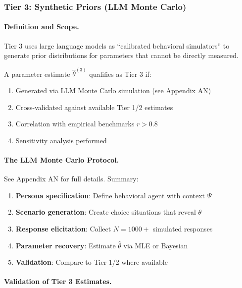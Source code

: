 \subsubsection{Tier 3: Synthetic Priors (LLM Monte Carlo)}

\paragraph{Definition and Scope.}

Tier 3 uses large language models as ``calibrated behavioral simulators'' to 
generate prior distributions for parameters that cannot be directly measured.

\begin{definition}
A parameter estimate $\hat{\theta}^{(3)}$ qualifies as Tier 3 if:
\begin{enumerate}
    \item Generated via LLM Monte Carlo simulation (see Appendix AN)
    \item Cross-validated against available Tier 1/2 estimates
    \item Correlation with empirical benchmarks $r > 0.8$
    \item Sensitivity analysis performed
\end{enumerate}
\end{definition}

\paragraph{The LLM Monte Carlo Protocol.}

See Appendix AN for full details. Summary:

\begin{enumerate}
    \item \textbf{Persona specification}: Define behavioral agent with context $\Psi$
    \item \textbf{Scenario generation}: Create choice situations that reveal $\theta$
    \item \textbf{Response elicitation}: Collect $N = 1000+$ simulated responses
    \item \textbf{Parameter recovery}: Estimate $\hat{\theta}$ via MLE or Bayesian
    \item \textbf{Validation}: Compare to Tier 1/2 where available
\end{enumerate}

\paragraph{Validation of Tier 3 Estimates.}

